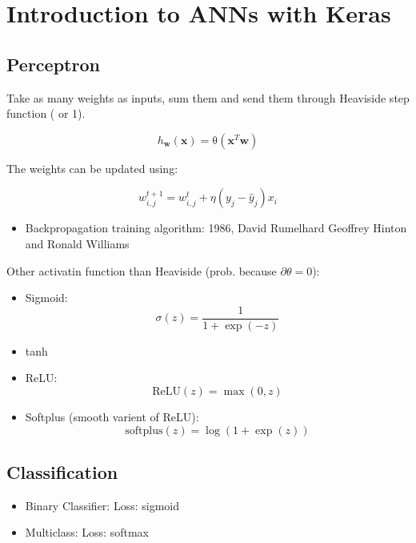 \newpage
\section{Introduction to ANNs with Keras}

\subsection{Perceptron}
Take as many weights as inputs, sum them and send them through Heaviside step function ( or 1).

\begin{equation}
    h_\mathbf{w}(\mathbf{x}) = \mathrm{\theta}(\mathbf{x}^T\mathbf{w})
\end{equation}

The weights can be updated using:

\begin{equation}
    w_{i,j}^{t+1} = w_{i,j}^t + \eta \left(y_j - \hat{y}_j\right) x_i
\end{equation}

\begin{itemize}
    \item Backpropagation training algorithm: 1986, David Rumelhard Geoffrey Hinton and Ronald Williams
\end{itemize}

Other activatin function than Heaviside (prob. because $\partial \theta= 0$):

\begin{itemize}
    \item Sigmoid:
        \[
            \sigma (z) = \frac{1}{1+\exp(-z)}
        \]
    \item tanh
    \item ReLU:
        \[
            \mathrm{ReLU}(z) = \max(0, z)
        \]
    \item Softplus (smooth varient of ReLU):
        \[
            \mathrm{softplus}(z) = \log(1+\exp(z))
        \]
\end{itemize}

\subsection{Classification}
\begin{itemize}
    \item Binary Classifier:
        Loss: sigmoid
    \item Multiclass:
        Loss: softmax
\end{itemize}



